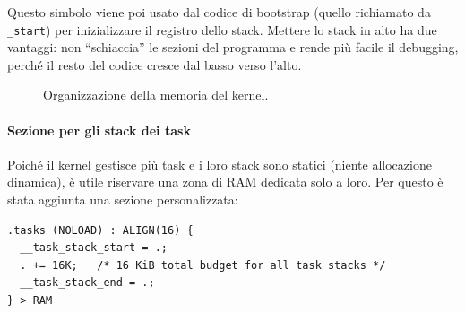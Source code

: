 \documentclass[italian, Lau, oneside]{sapthesis} %
\begin{document}
Questo simbolo viene poi usato dal codice di bootstrap (quello richiamato da \texttt{\_start}) per inizializzare il registro dello stack.  
Mettere lo stack in alto ha due vantaggi: non “schiaccia” le sezioni del programma e rende più facile il debugging, perché il resto del codice cresce dal basso verso l’alto.

\begin{figure}[H]
\centering
{}
\caption{Organizzazione della memoria del kernel.}
\label{fig:memory_layout}
\end{figure}

\paragraph{Sezione per gli stack dei task}
Poiché il kernel gestisce più task e i loro stack sono statici (niente allocazione dinamica), è utile riservare una zona di RAM dedicata solo a loro.  
Per questo è stata aggiunta una sezione personalizzata:

\begin{center}
\begin{verbatim}
.tasks (NOLOAD) : ALIGN(16) {
  __task_stack_start = .;
  . += 16K;   /* 16 KiB total budget for all task stacks */
  __task_stack_end = .;
} > RAM
\end{verbatim}
\end{center}
\end{document}
